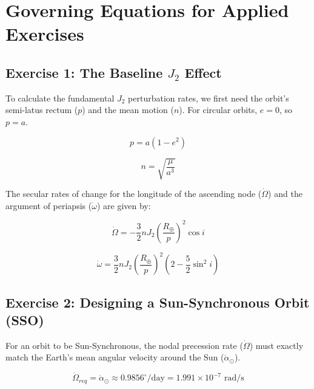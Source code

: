 \documentclass[12pt]{article}
\begin{document}
\section*{Governing Equations for Applied Exercises}

\subsection*{Exercise 1: The Baseline $J_2$ Effect}
To calculate the fundamental $J_2$ perturbation rates, we first need the orbit's semi-latus rectum ($p$) and the mean motion ($n$). For circular orbits, $e = 0$, so $p = a$.

\begin{equation}
    p = a(1 - e^2)
\end{equation}

\begin{equation}
    n = \sqrt{\frac{\mu}{a^3}}
\end{equation}

The secular rates of change for the longitude of the ascending node ($\dot{\Omega}$) and the argument of periapsis ($\dot{\omega}$) are given by:

\begin{equation}
    \dot{\Omega} = -\frac{3}{2} n J_2 \left( \frac{R_{\oplus}}{p} \right)^2 \cos i
\end{equation}

\begin{equation}
    \dot{\omega} = \frac{3}{2} n J_2 \left( \frac{R_{\oplus}}{p} \right)^2 \left( 2 - \frac{5}{2} \sin^2 i \right)
\end{equation}


\subsection*{Exercise 2: Designing a Sun-Synchronous Orbit (SSO)}
For an orbit to be Sun-Synchronous, the nodal precession rate ($\dot{\Omega}$) must exactly match the Earth's mean angular velocity around the Sun ($\dot{\alpha}_{\odot}$).

\begin{equation}
    \dot{\Omega}_{req} = \dot{\alpha}_{\odot} \approx 0.9856^{\circ}/\text{day} = 1.991 \times 10^{-7} \text{ rad/s}
\end{equation}
\end{document}
